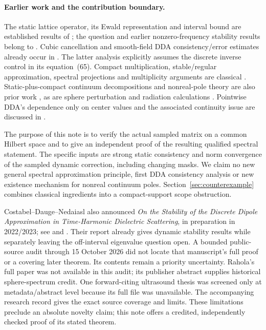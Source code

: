 \documentclass[11pt]{article}
\theoremstyle{remark}\newtheorem{remark}[theorem]{Remark}
\begin{document}
\paragraph{Earlier work and the contribution boundary.}
The static lattice operator, its Ewald representation and interval bound are established results of \cite{CDN}; the question and earlier nonzero-frequency stability results belong to \cite{OWR}. Cubic cancellation and smooth-field DDA consistency/error estimates already occur in \cite{YMH,YMHerr}. The latter analysis explicitly assumes the discrete inverse control in its equation~(65). Compact multiplication, stable/regular approximation, spectral projections and multiplicity arguments are classical \cite{AP,AT,DNR}. Static-plus-compact continuum decompositions and nonreal-pole theory are also prior work \cite{BS,Zhou,ALZ}, as are sphere perturbation and radiation calculations \cite{Rahola,AM,Mie}. Pointwise DDA's dependence only on center values and the associated continuity issue are discussed in \cite[\S IX, footnote~22]{YM}.

The purpose of this note is to verify the actual sampled matrix on a common Hilbert space and to give an independent proof of the resulting qualified spectral statement. The specific inputs are strong static consistency and norm convergence of the sampled dynamic correction, including changing masks. We claim no new general spectral approximation principle, first DDA consistency analysis or new existence mechanism for nonreal continuum poles. Section~\ref{sec:counterexample} combines classical ingredients into a compact-support scope obstruction.

Costabel--Dauge--Nedaiasl also announced \emph{On the Stability of the Discrete Dipole Approximation in Time-Harmonic Dielectric Scattering}, in preparation in 2022/2023; see \cite{IMU} and \cite[reference~3]{Hilbert}. Their report already gives dynamic stability results while separately leaving the off-interval eigenvalue question open. A bounded public-source audit through 15 October 2026 did not locate that manuscript's full proof or a covering later theorem. Its contents remain a priority uncertainty. Rahola's full paper was not available in this audit; its publisher abstract supplies historical sphere-spectrum credit. One forward-citing ultrasound thesis was screened only at metadata/abstract level because its full file was unavailable. The accompanying research record gives the exact source coverage and limits. These limitations preclude an absolute novelty claim; this note offers a credited, independently checked proof of its stated theorem.
\end{document}
